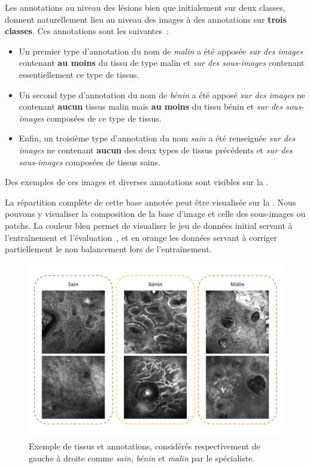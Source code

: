 Les annotations au niveau des lésions bien que initialement sur deux classes, donnent naturellement lieu au niveau des images à des annotations sur \textbf{trois classes}. Ces annotations sont les suivantes~:
\begin{itemize}
    \item Un premier type d'annotation du nom de \textit{malin} a été apposée \textit{sur des images} contenant \textbf{au moins} du tissu de type malin et \textit{sur des sous-images} contenant essentiellement ce type de tissus. 
    \item Un second type d'annotation du nom de \textit{bénin} a été apposé \textit{sur des images} ne contenant \textbf{aucun} tissus malin mais \textbf{au moins} du tissu bénin et \textit{sur des sous-images} composées de ce type de tissus. 
    \item  Enfin, un troisième type d'annotation du nom \textit{sain} a été renseignée \textit{sur des images} ne contenant \textbf{aucun} des deux types de tissus précédents et \textit{sur des sous-images} composées de tissus sains. 
\end{itemize} Des exemples de ces images et diverses annotations sont visibles sur la .\par

La répartition complète de cette base annotée peut être visualisée sur la . Nous pouvons y visualiser la composition de la base d'image et celle des sous-images ou patchs. La couleur bleu permet de visualiser le jeu de données initial servant à l'entraînement et l'évaluation~\cite{Cinotti2018}, et en orange les données servant à corriger partiellement le non balancement lors de l'entraînement.\par

\begin{figure}[H]
    \begin{center}
        \includegraphics[width=\linewidth]{contents/ii_preamble_microscopy/resources/example_rcm_data.pdf}
        \caption{Exemple de tissus et annotations, considérés respectivement de gauche à droite comme \textit{sain}, \textit{bénin} et \textit{malin} par le spécialiste.}
        \label{fig:example_rcm_data}
    \end{center} 
\end{figure}\par

